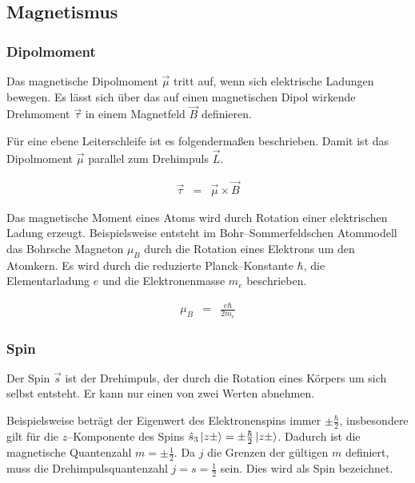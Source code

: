 \documentclass[12pt,a4paper]{scrartcl}
\numberwithin{equation}{section} %
\begin{document}
\hypertarget{magnetismus}{%
\subsection{Magnetismus}\label{magnetismus}}

\hypertarget{dipolmoment}{%
\subsubsection{Dipolmoment}\label{dipolmoment}}

Das magnetische Dipolmoment $\vec \mu$ tritt auf, wenn sich
elektrische Ladungen bewegen. Es lässt sich über das auf einen
magnetischen Dipol wirkende Drehmoment $\vec \tau$ in einem Magnetfeld
$\vec B$ definieren.

Für eine ebene Leiterschleife ist es folgendermaßen beschrieben.
\cite{Jackson} Damit ist das Dipolmoment $\vec \mu$ parallel zum
Drehimpuls $\vec{L}$.

\begin{eqnarray}
    \vec \tau &=& \vec \mu \times \vec B
\end{eqnarray}

Das magnetische Moment eines Atoms wird durch Rotation einer
elektrischen Ladung erzeugt. Beispielsweise entsteht im
Bohr--Sommerfeldschen Atommodell das Bohrsche Magneton $\mu_B$ durch
die Rotation eines Elektrons um den Atomkern. Es wird durch die
reduzierte Planck--Konstante $\hbar$, die Elementarladung $e$ und
die Elektronenmasse $m_e$ beschrieben.

\begin{eqnarray}
    \mu_B &=& \frac{e\hbar}{2m_e}
\end{eqnarray}

\hypertarget{spin}{%
\subsubsection{Spin}\label{spin}}

Der Spin $\vec s$ ist der Drehimpuls, der durch die Rotation eines
Körpers um sich selbst entsteht. Er kann nur einen von zwei Werten
abnehmen.

Beispielsweise beträgt der Eigenwert des Elektronenspins immer
$\pm\frac{\hbar}{2}$, insbesondere gilt für die $z$--Komponente des
Spins $\hat s_3\ket{z\pm}=\pm\frac{\hbar}{2}\ket{z\pm}$. Dadurch ist
die magnetische Quantenzahl $m=\pm\frac{1}{2}$. Da $j$ die Grenzen
der gültigen $m$ definiert, muss die Drehimpulsquantenzahl
$j=s=\frac{1}{2}$ sein. Dies wird als Spin bezeichnet.
\end{document}
